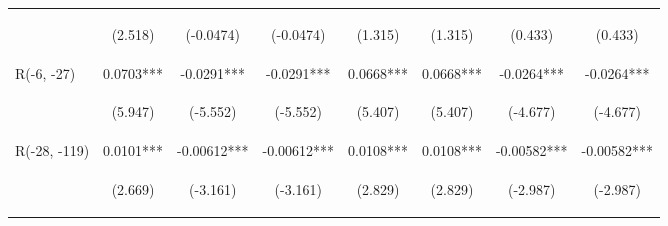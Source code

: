\documentclass[]{article}
\begin{document}
\begin{center}
\begin{tabular}{lccccccc}
\vspace{4pt} & \begin{footnotesize}(2.518)\end{footnotesize} & \begin{footnotesize}(-0.0474)\end{footnotesize} & \begin{footnotesize}(-0.0474)\end{footnotesize} & \begin{footnotesize}(1.315)\end{footnotesize} & \begin{footnotesize}(1.315)\end{footnotesize} & \begin{footnotesize}(0.433)\end{footnotesize} & \begin{footnotesize}(0.433)\end{footnotesize} \\
R(-6, -27) & 0.0703*** & -0.0291*** & -0.0291*** & 0.0668*** & 0.0668*** & -0.0264*** & -0.0264*** \\
\vspace{4pt} & \begin{footnotesize}(5.947)\end{footnotesize} & \begin{footnotesize}(-5.552)\end{footnotesize} & \begin{footnotesize}(-5.552)\end{footnotesize} & \begin{footnotesize}(5.407)\end{footnotesize} & \begin{footnotesize}(5.407)\end{footnotesize} & \begin{footnotesize}(-4.677)\end{footnotesize} & \begin{footnotesize}(-4.677)\end{footnotesize} \\
R(-28, -119) & 0.0101*** & -0.00612*** & -0.00612*** & 0.0108*** & 0.0108*** & -0.00582*** & -0.00582*** \\
\vspace{4pt} & \begin{footnotesize}(2.669)\end{footnotesize} & \begin{footnotesize}(-3.161)\end{footnotesize} & \begin{footnotesize}(-3.161)\end{footnotesize} & \begin{footnotesize}(2.829)\end{footnotesize} & \begin{footnotesize}(2.829)\end{footnotesize} & \begin{footnotesize}(-2.987)\end{footnotesize} & \begin{footnotesize}(-2.987)\end{footnotesize} \\

\end{tabular}
\end{center}
\end{document}
